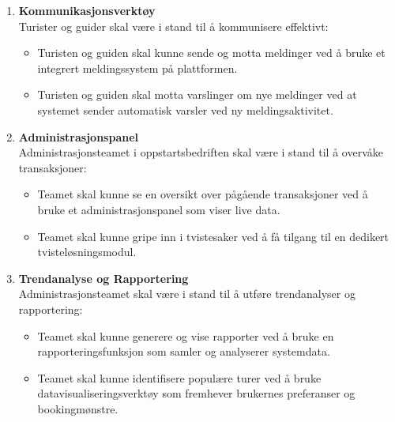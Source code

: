 \documentclass[../doc.tex]{subfiles}
\begin{document}
\begin{enumerate}
    \item \textbf{Kommunikasjonsverktøy} \\
    Turister og guider skal være i stand til å kommunisere effektivt:
    \begin{itemize}
        \item Turisten og guiden skal kunne sende og motta meldinger ved å bruke et integrert meldingssystem på plattformen.
        \item Turisten og guiden skal motta varslinger om nye meldinger ved at systemet sender automatisk varsler ved ny meldingsaktivitet.
    \end{itemize}
    \item \textbf{Administrasjonspanel} \\
    Administrasjonsteamet i oppstartsbedriften skal være i stand til å overvåke transaksjoner:
    \begin{itemize}
        \item Teamet skal kunne se en oversikt over pågående transaksjoner ved å bruke et administrasjonspanel som viser live data.
        \item Teamet skal kunne gripe inn i tvistesaker ved å få tilgang til en dedikert tvisteløsningsmodul.
    \end{itemize}

    \item \textbf{Trendanalyse og Rapportering} \\
    Administrasjonsteamet skal være i stand til å utføre trendanalyser og rapportering:
    \begin{itemize}
        \item Teamet skal kunne generere og vise rapporter ved å bruke en rapporteringsfunksjon som samler og analyserer systemdata.
        \item Teamet skal kunne identifisere populære turer ved å bruke datavisualiseringsverktøy som fremhever brukernes preferanser og bookingmønstre.
    \end{itemize}

\end{enumerate}
\end{document}
